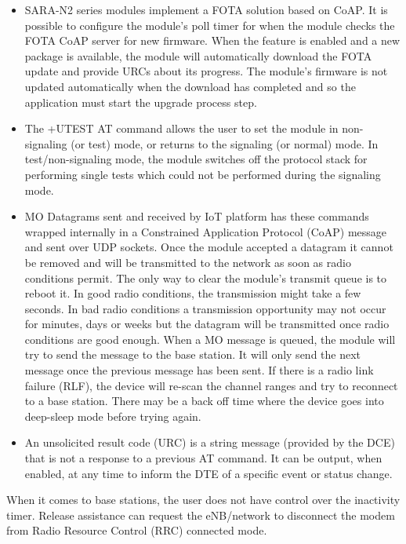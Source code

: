 \documentclass[]{article}
\providecommand{\tightlist}{%
  \setlength{\itemsep}{0pt}\setlength{\parskip}{0pt}}
\begin{document}
\begin{itemize}
\tightlist
\item
  SARA-N2 series modules implement a FOTA solution based on CoAP. It is
  possible to configure the module's poll timer for when the module
  checks the FOTA CoAP server for new firmware. When the feature is
  enabled and a new package is available, the module will automatically
  download the FOTA update and provide URCs about its progress. The
  module's firmware is not updated automatically when the download has
  completed and so the application must start the upgrade process step.
\item
  The +UTEST AT command allows the user to set the module in
  non-signaling (or test) mode, or returns to the signaling (or normal)
  mode. In test/non-signaling mode, the module switches off the protocol
  stack for performing single tests which could not be performed during
  the signaling mode.
\item
  MO Datagrams sent and received by IoT platform has these commands
  wrapped internally in a Constrained Application Protocol (CoAP)
  message and sent over UDP sockets. Once the module accepted a datagram
  it cannot be removed and will be transmitted to the network as soon as
  radio conditions permit. The only way to clear the module's transmit
  queue is to reboot it. In good radio conditions, the transmission
  might take a few seconds. In bad radio conditions a transmission
  opportunity may not occur for minutes, days or weeks but the datagram
  will be transmitted once radio conditions are good enough. When a MO
  message is queued, the module will try to send the message to the base
  station. It will only send the next message once the previous message
  has been sent. If there is a radio link failure (RLF), the device will
  re-scan the channel ranges and try to reconnect to a base station.
  There may be a back off time where the device goes into deep-sleep
  mode before trying again.
\item
  An unsolicited result code (URC) is a string message (provided by the
  DCE) that is not a response to a previous AT command. It can be
  output, when enabled, at any time to inform the DTE of a specific
  event or status change.
\end{itemize}

When it comes to base stations, the user does not have control over the
inactivity timer. Release assistance can request the eNB/network to
disconnect the modem from Radio Resource Control (RRC) connected mode.
\end{document}
